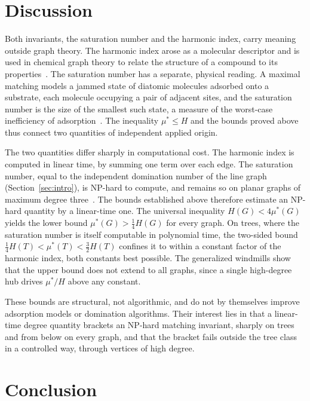 \documentclass[11pt]{article}
\theoremstyle{definition}
\theoremstyle{remark}
\newcommand{\mustar}{\mu^{*}}
\begin{document}
\section{Discussion}\label{sec:discussion}

Both invariants, the saturation number and the harmonic index, carry meaning
outside graph theory.  The
harmonic index arose as a molecular descriptor and is used in chemical graph
theory to relate the structure of a compound to its
properties~\cite{Fajtlowicz1987harmonic, Zhong2012harmonic}.  The saturation
number has a separate, physical reading.  A maximal matching models a jammed
state of diatomic molecules adsorbed onto a substrate, each molecule occupying
a pair of adjacent sites, and the saturation number is the size of the smallest
such state, a measure of the worst-case inefficiency of
adsorption~\cite{Ahmadi2017saturation}.  The inequality $\mustar \le H$ and the
bounds proved above thus connect two quantities of independent applied origin.

The two quantities differ sharply in computational cost.  The harmonic index is
computed in linear time, by summing one term over each edge.  The saturation
number, equal to the independent domination number of the line graph
(Section~\ref{sec:intro}), is NP-hard to compute, and remains so on planar
graphs of maximum degree three~\cite{Ahmadi2017saturation}.  The bounds
established above therefore estimate an NP-hard quantity by a linear-time one.
The universal inequality $H(G) < 4\mustar(G)$ yields the lower bound
$\mustar(G) > \tfrac14 H(G)$ for every graph.  On trees, where the saturation
number is itself computable in polynomial time, the two-sided bound
$\tfrac14 H(T) < \mustar(T) < \tfrac32 H(T)$ confines it to within a constant
factor of the harmonic index, both constants best possible.  The generalized
windmills show that the upper bound does not extend to all graphs,
since a single high-degree hub drives $\mustar/H$ above any constant.

These bounds are structural, not algorithmic, and do not by themselves improve
adsorption models or domination algorithms.  Their interest lies in that a
linear-time degree quantity brackets an NP-hard matching invariant, sharply on
trees and from below on every graph, and that the bracket fails outside the tree
class in a controlled way, through vertices of high degree.

\section{Conclusion}\label{sec:conclusion}
\end{document}
